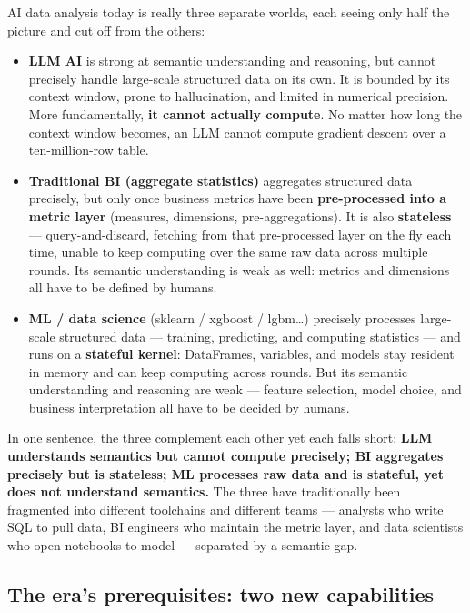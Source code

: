 \documentclass[11pt]{article}
\begin{document}
AI data analysis today is really three separate worlds, each seeing only half the picture and cut off from the others:

\begin{itemize}
\item
  \textbf{LLM AI} is strong at semantic understanding and reasoning, but cannot precisely handle large-scale structured data on its own. It is bounded by its context window, prone to hallucination, and limited in numerical precision. More fundamentally, \textbf{it cannot actually compute}. No matter how long the context window becomes, an LLM cannot compute gradient descent over a ten-million-row table.
\item
  \textbf{Traditional BI (aggregate statistics)} aggregates structured data precisely, but only once business metrics have been \textbf{pre-processed into a metric layer} (measures, dimensions, pre-aggregations). It is also \textbf{stateless} --- query-and-discard, fetching from that pre-processed layer on the fly each time, unable to keep computing over the same raw data across multiple rounds. Its semantic understanding is weak as well: metrics and dimensions all have to be defined by humans.
\item
  \textbf{ML / data science} (sklearn / xgboost / lgbm\ldots) precisely processes large-scale structured data --- training, predicting, and computing statistics --- and runs on a \textbf{stateful kernel}: DataFrames, variables, and models stay resident in memory and can keep computing across rounds. But its semantic understanding and reasoning are weak --- feature selection, model choice, and business interpretation all have to be decided by humans.
\end{itemize}

In one sentence, the three complement each other yet each falls short: \textbf{LLM understands semantics but cannot compute precisely; BI aggregates precisely but is stateless; ML processes raw data and is stateful, yet does not understand semantics.} The three have traditionally been fragmented into different toolchains and different teams --- analysts who write SQL to pull data, BI engineers who maintain the metric layer, and data scientists who open notebooks to model --- separated by a semantic gap.

\subsection{The era's prerequisites: two new capabilities}
\end{document}
